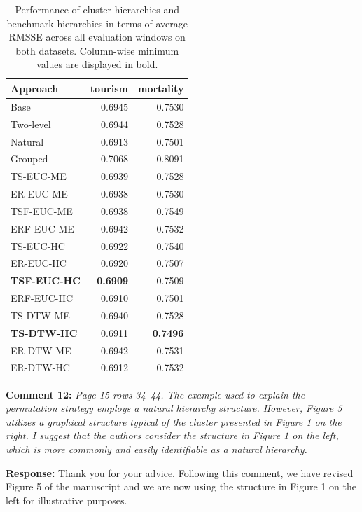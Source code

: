 \documentclass{article}
\numberwithin{equation}{section}
\theoremstyle{plain}
\theoremstyle{definition}
\theoremstyle{remark}
\begin{document}
\begin{table}
    \centering
    \vspace{-0.8in}
\caption{\label{tab:P2_rmsse}Performance of cluster hierarchies and benchmark hierarchies in terms of average RMSSE across all evaluation windows on both datasets. Column-wise minimum values are displayed in bold.}
\begin{tabular}{lrr}\toprule
    Approach & tourism & mortality \\ \midrule
    Base & 0.6945 & 0.7530 \\ 
    Two-level & 0.6944 & 0.7528 \\ 
    Natural & 0.6913 & 0.7501 \\ 
    Grouped & 0.7068 & 0.8091\\
    TS-EUC-ME & 0.6939 & 0.7528 \\ 
    ER-EUC-ME & 0.6938 & 0.7530 \\ 
    TSF-EUC-ME & 0.6938 & 0.7549 \\ 
    ERF-EUC-ME & 0.6942 & 0.7532 \\ 
    TS-EUC-HC & 0.6922 & 0.7540 \\ 
    ER-EUC-HC & 0.6920 & 0.7507 \\ 
    \textbf{TSF-EUC-HC} & \textbf{0.6909} & 0.7509 \\ 
    ERF-EUC-HC & 0.6910 & 0.7501 \\ 
    TS-DTW-ME & 0.6940 & 0.7528 \\ 
    \textbf{TS-DTW-HC} & 0.6911 & \textbf{0.7496} \\ 
    ER-DTW-ME & 0.6942 & 0.7531 \\ 
    ER-DTW-HC & 0.6912 & 0.7532 \\ \bottomrule
\end{tabular}

\end{table}

\textbf{Comment 12:} \textit{Page 15 rows 34--44. The example used to explain the permutation strategy employs a natural hierarchy structure. However, Figure 5 utilizes a graphical structure typical of the cluster presented in Figure 1 on the right. I suggest that the authors consider the structure in Figure 1 on the left, which is more commonly and easily identifiable as a natural hierarchy.}

\medskip

\noindent \textbf{Response:} {Thank you for your advice. Following this comment, we have revised Figure 5 of the manuscript and we are now using the structure in Figure 1 on the left for illustrative purposes. }\\
\end{document}
